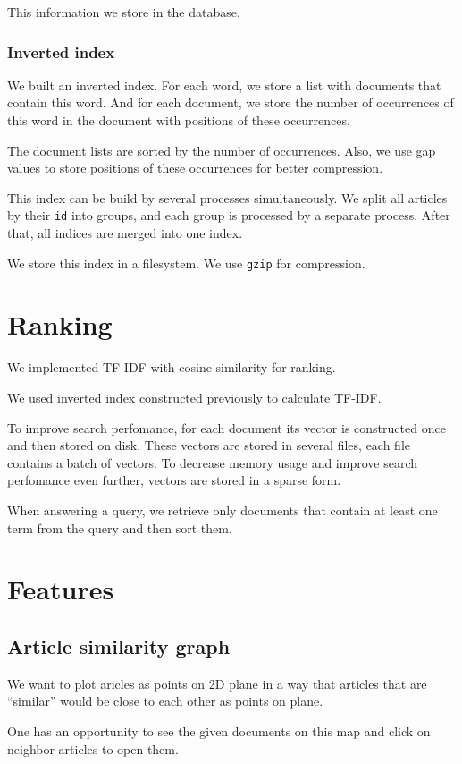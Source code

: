 This information we store in the database.

\subsubsection{Inverted index}
We built an inverted index. For each word, we store a list with documents that contain this word. And for each document, we store the number of occurrences of this word in the document with positions of these occurrences.

The document lists are sorted by the number of occurrences. Also, we use gap values to store positions of these occurrences for better compression.

This index can be build by several processes simultaneously. We split all articles by their \texttt{id} into groups, and each group is processed by a separate process. After that, all indices are merged into one index.

We store this index in a filesystem. We use \texttt{gzip} for compression.

\section{Ranking}
We implemented TF-IDF with cosine similarity for ranking.

We used inverted index constructed previously to calculate TF-IDF. 

To improve search perfomance, for each document its vector is constructed once and then stored on disk. 
These vectors are stored in several files, each file contains a batch of vectors.
To decrease memory usage and improve search perfomance even further, vectors are stored in a sparse form.

When answering a query, we retrieve only documents that contain at least one term from the query and then sort them.


\section{Features}
\subsection{Article similarity graph}
We want to plot aricles as points on 2D plane in a way that articles that are ``similar'' would be close to each other as points on plane.

One has an opportunity to see the given documents on this map and click on neighbor articles to open them. 

